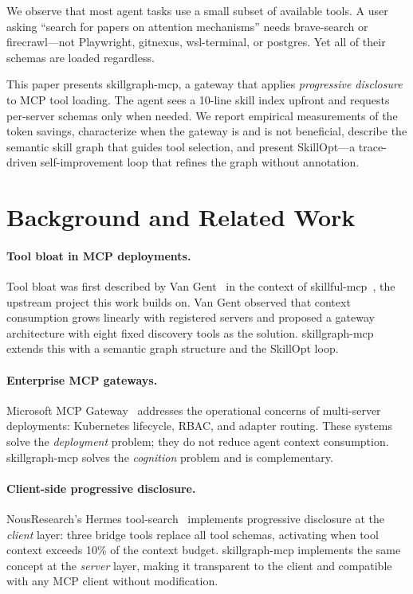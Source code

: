\documentclass[11pt,a4paper]{article}
\begin{document}
We observe that most agent tasks use a small subset of available tools. A user asking
``search for papers on attention mechanisms'' needs brave-search or firecrawl---not
Playwright, gitnexus, wsl-terminal, or postgres. Yet all of their schemas are loaded
regardless.

This paper presents skillgraph-mcp, a gateway that applies \emph{progressive
disclosure} to MCP tool loading. The agent sees a 10-line skill index upfront and
requests per-server schemas only when needed. We report empirical measurements of the
token savings, characterize when the gateway is and is not beneficial, describe the
semantic skill graph that guides tool selection, and present SkillOpt---a trace-driven
self-improvement loop that refines the graph without annotation.

\section{Background and Related Work}
\label{sec:related}

\paragraph{Tool bloat in MCP deployments.}
Tool bloat was first described by Van Gent~\cite{vangent2026blog} in the context of
skillful-mcp~\cite{skillful2026}, the upstream project this work builds on. Van Gent
observed that context consumption grows linearly with registered servers and proposed a
gateway architecture with eight fixed discovery tools as the solution. skillgraph-mcp
extends this with a semantic graph structure and the SkillOpt loop.

\paragraph{Enterprise MCP gateways.}
Microsoft MCP Gateway~\cite{msgwateway2025} addresses the operational concerns of
multi-server deployments: Kubernetes lifecycle, RBAC, and adapter routing. These
systems solve the \emph{deployment} problem; they do not reduce agent context
consumption. skillgraph-mcp solves the \emph{cognition} problem and is complementary.

\paragraph{Client-side progressive disclosure.}
NousResearch's Hermes tool-search~\cite{hermes2025} implements progressive disclosure
at the \emph{client} layer: three bridge tools replace all tool schemas, activating
when tool context exceeds 10\% of the context budget. skillgraph-mcp implements the
same concept at the \emph{server} layer, making it transparent to the client and
compatible with any MCP client without modification.
\end{document}
